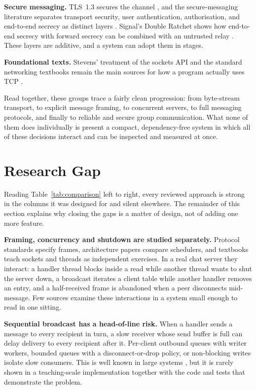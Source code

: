 \documentclass[conference]{IEEEtran}
\begin{document}
\textbf{Secure messaging.} TLS~1.3 secures the channel \cite{rfc8446}, and the secure-messaging literature separates transport security, user authentication, authorisation, and end-to-end secrecy as distinct layers \cite{unger}. Signal's Double Ratchet shows how end-to-end secrecy with forward secrecy can be combined with an untrusted relay \cite{signal,cohngordon}. These layers are additive, and a system can adopt them in stages.

\textbf{Foundational texts.} Stevens' treatment of the sockets API and the standard networking textbooks remain the main sources for how a program actually uses TCP \cite{stevens,tanenbaum,kurose}.

Read together, these groups trace a fairly clean progression: from byte-stream transport, to explicit message framing, to concurrent servers, to full messaging protocols, and finally to reliable and secure group communication. What none of them does individually is present a compact, dependency-free system in which all of these decisions interact and can be inspected and measured at once.

\section{Research Gap}
Reading Table~\ref{tab:comparison} left to right, every reviewed approach is strong in the columns it was designed for and silent elsewhere. The remainder of this section explains why closing the gaps is a matter of design, not of adding one more feature.

\textbf{Framing, concurrency and shutdown are studied separately.} Protocol standards specify frames, architecture papers compare schedulers, and textbooks teach sockets and threads as independent exercises. In a real chat server they interact: a handler thread blocks inside a read while another thread wants to shut the server down, a broadcast iterates a client table while another handler removes an entry, and a half-received frame is abandoned when a peer disconnects mid-message. Few sources examine these interactions in a system small enough to read in one sitting.

\textbf{Sequential broadcast has a head-of-line risk.} When a handler sends a message to every recipient in turn, a slow receiver whose send buffer is full can delay delivery to every recipient after it. Per-client outbound queues with writer workers, bounded queues with a disconnect-or-drop policy, or non-blocking writes isolate slow consumers. This is well known in large systems \cite{seda}, but it is rarely shown in a teaching-scale implementation together with the code and tests that demonstrate the problem.
\end{document}
